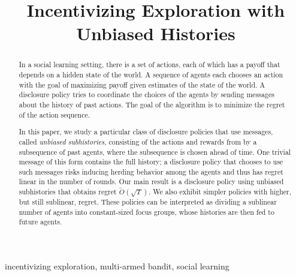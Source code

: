 \documentclass[anon,12pt]{colt2019}
\title{Incentivizing Exploration with Unbiased Histories}
\begin{document}
\maketitle

\begin{abstract}
In a social learning setting, there is a set of actions, each of which has a payoff that depends on a hidden state of the world. A sequence of agents each chooses an action with the goal of maximizing payoff given estimates of the state of the world.  A disclosure policy tries to coordinate the choices of the agents by sending messages about the history of past actions.  The goal of the algorithm is to minimize the regret of the action sequence.

In this paper, we study a particular class of disclosure policies that use messages, called {\em unbiased subhistories}, consisting of the actions and rewards from by a subsequence of past agents, where the subsequence is chosen ahead of time. One trivial message of this form contains the full history; a disclosure policy that chooses to use such messages risks inducing herding behavior among the agents and thus has regret linear in the number of rounds.  Our main result is a disclosure policy using unbiased subhistories that obtains regret $\tilde{O}(\sqrt{T})$.  We also exhibit simpler policies with higher, but still sublinear, regret.  These policies can be interpreted as dividing a sublinear number of agents into constant-sized focus groups, whose histories are then fed to future agents.
\end{abstract}
\begin{keywords}%
  incentivizing exploration, multi-armed bandit, social learning
\end{keywords}



%







%
%


\appendix






%
\end{document}
